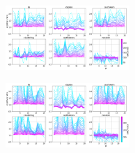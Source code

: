 \documentclass{article}
\begin{document}
\begin{figure}[t]
    \centering
    \caption{}
    \label{fig_specific_framework_detereigevect}
\end{figure}

\begin{figure}[b]
\includegraphics[width=0.42\textwidth]{manuscript/figures/d01_milk_specific_framework_eigenvalsratio.png}
\centering
\caption{}
\label{fig_d01_milk_specific_framework_eigenvalsratio}
\end{figure}

\begin{figure}[b]
\includegraphics[width=0.42\textwidth]{manuscript/figures/d02_manure_specific_framework_eigenvalsratio.png}
\centering
\caption{}
\label{fig_d02_manure_specific_framework_eigenvalsratio}
\end{figure}
\end{document}
